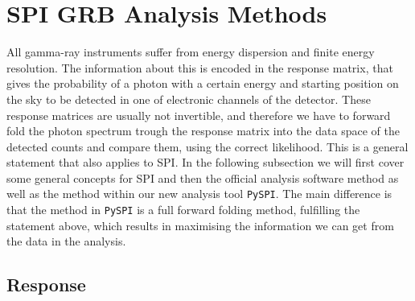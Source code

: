 \documentclass[twocolumn,traditabstract]{aa}
\begin{document}
\section{SPI GRB Analysis Methods}
\label{methods}
All gamma-ray instruments suffer from energy dispersion and finite energy resolution. The information about this is encoded in the response matrix, that gives the probability of a photon with a certain energy and starting position on the sky to be detected in one of electronic channels of the detector. These response matrices are usually not invertible, and therefore we have to forward fold the photon spectrum trough the response matrix into the data space of the detected counts and compare them, using the correct likelihood. This is a general statement that also applies to SPI. In the following subsection we will first cover some general concepts for SPI and then the official analysis software method as well as the method within our new analysis tool {\tt PySPI}. The main difference is that the method in {\tt PySPI} is a full forward folding method, fulfilling the statement above, which results in maximising the information we can get from the data in the analysis.

\subsection{Response}
\label{response}
\end{document}
